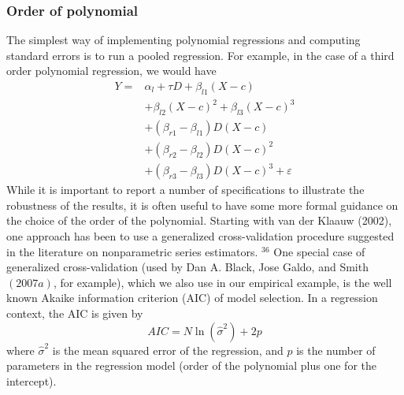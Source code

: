 \documentclass[11pt]{book}%
\begin{document}
\subsubsection{Order of polynomial}
 The simplest way of implementing polynomial regressions and computing standard errors is to run a pooled regression. For example, in the case of a third order polynomial regression, we would have
 $$
 \begin{aligned}
 Y=& \alpha_{l}+\tau D+\beta_{l 1}(X-c) \\
 &+\beta_{l 2}(X-c)^{2}+\beta_{l 3}(X-c)^{3} \\
 &+\left(\beta_{r 1}-\beta_{l 1}\right) D(X-c) \\
 &+\left(\beta_{r 2}-\beta_{l 2}\right) D(X-c)^{2} \\
 &+\left(\beta_{r 3}-\beta_{l 3}\right) D(X-c)^{3}+\varepsilon
 \end{aligned}
 $$
 While it is important to report a number of specifications to illustrate the robustness of the results, it is often useful to have some more formal guidance on the choice of the order of the polynomial. Starting with van der Klaauw (2002), one approach has been to use a generalized cross-validation procedure suggested in the literature on nonparametric series estimators. ${ }^{36}$ One special case of generalized cross-validation (used by Dan
 A. Black, Jose Galdo, and Smith $(2007 a)$, for example), which we also use in our empirical example, is the well known Akaike information criterion (AIC) of model selection. In a regression context, the AIC is given by
 $$
 A I C=N \ln \left(\hat{\sigma}^{2}\right)+2 p
 $$
 where $\hat{\sigma}^{2}$ is the mean squared error of the regression, and $p$ is the number of parameters in the regression model (order of the polynomial plus one for the intercept).
 
\end{document}
